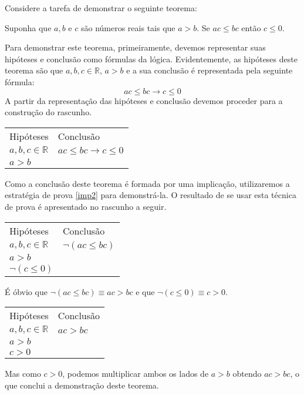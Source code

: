 \begin{Example}
Considere a tarefa de demonstrar o seguinte teorema:
\begin{flushleft}
Suponha que $a,b$ e $c$ são números reais tais que $a > b$. Se $ac
\leq bc$ então $c\leq 0$.
\end{flushleft}
Para demonstrar este teorema, primeiramente, devemos representar suas
hipóteses e conclusão como fórmulas da lógica. Evidentemente, as
hipóteses deste teorema são que $a,b,c\in\mathbb{R}$, $a > b$ e a sua conclusão
é representada pela seguinte fórmula:
\[
ac\leq bc \to c \leq 0
\]
A partir da representação das hipóteses e conclusão devemos proceder
para a construção do rascunho.
\begin{flushleft}
\begin{tabular}{ll}
Hipóteses & Conclusão \\
$a,b,c\in\mathbb{R}$ & $ ac\leq bc \to c \leq 0$\\
$a > b$ & \\
\end{tabular}
\end{flushleft}
Como a conclusão deste teorema é formada por uma implicação,
utilizaremos a estratégia de prova \ref{imp2} para demonstrá-la. O
resultado de se usar esta técnica de prova é apresentado no rascunho a
seguir.
\begin{flushleft}
\begin{tabular}{ll}
Hipóteses & Conclusão \\
$a,b,c\in\mathbb{R}$ & $ \neg (ac\leq bc)$\\
$a > b$ & \\
$\neg (c\leq 0)$ &
\end{tabular}
\end{flushleft}
É óbvio que $\neg (ac \leq bc) \equiv ac > bc$ e que $\neg (c \leq 0)
\equiv c > 0$.
\begin{flushleft}
\begin{tabular}{ll}
Hipóteses & Conclusão \\
$a,b,c\in\mathbb{R}$ & $ac > bc$\\
$a > b$ & \\
$c > 0$ &
\end{tabular}
\end{flushleft}
Mas como $c > 0$, podemos multiplicar ambos os lados de $a > b$
obtendo $ac > bc$, o que conclui a demonstração deste teorema.


\end{Example}
